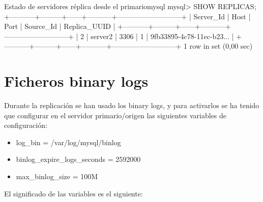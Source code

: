 \begin{mycode}{Estado de servidores réplica desde el primario}{mysql}{}
mysql> SHOW REPLICAS;
+-----------+---------+------+-----------+---------------------------+
| Server_Id | Host    | Port | Source_Id | Replica_UUID              |
+-----------+---------+------+-----------+---------------------------+
|         2 | server2 | 3306 |         1 | 9fb33895-4c78-11ec-b23... |
+-----------+---------+------+-----------+---------------------------+
1 row in set (0,00 sec)
\end{mycode}


\section{Ficheros binary logs}
Durante la replicación se han usado los binary logs, y para activarlos se ha tenido que configurar en el servidor primario/origen las siguientes variables de configuración:
\begin{itemize}
    \item log\_bin = /var/log/mysql/binlog
    \item binlog\_expire\_logs\_seconds = 2592000
    \item max\_binlog\_size = 100M
\end{itemize}

El significado de las variables es el siguiente:

